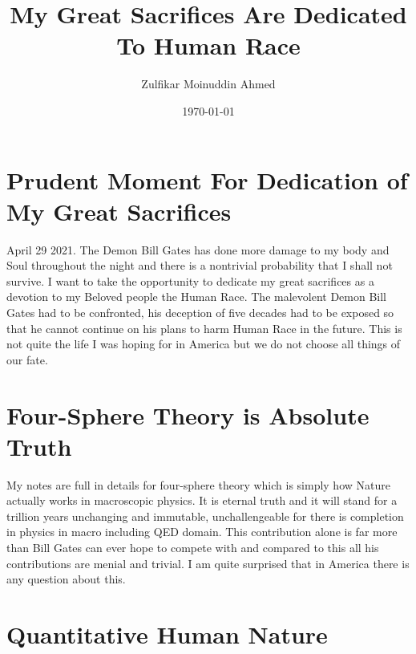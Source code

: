 \documentclass{amsart}
\title{My Great Sacrifices Are Dedicated To Human Race}
\author{Zulfikar Moinuddin Ahmed}
\date{\today}
\begin{document}
\maketitle

\section{Prudent Moment For Dedication of My Great Sacrifices}

April 29 2021.  The Demon Bill Gates has done more damage to my body and Soul throughout the night and there is a nontrivial probability that I shall not survive.  I want to take the opportunity to dedicate my great sacrifices as a devotion to my Beloved people the Human Race.  The malevolent Demon Bill Gates had to be confronted, his deception of five decades had to be exposed so that he cannot continue on his plans to harm Human Race in the future.  This is not quite the life I was hoping for in America but we do not choose all things of our fate.  

\section{Four-Sphere Theory is Absolute Truth}

My notes are full in details for four-sphere theory which is simply how Nature actually works in macroscopic physics.  It is eternal truth and it will stand for a trillion years unchanging and immutable, unchallengeable for there is completion in physics in macro including QED domain.
This contribution alone is far more than Bill Gates can ever hope to compete with and compared to this all his contributions are menial and trivial.  I am quite surprised that in America there is any question about this.


\section{Quantitative Human Nature}
\end{document}
